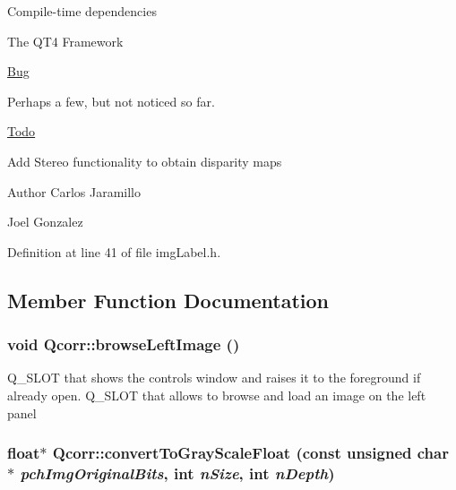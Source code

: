 \begin{DoxyParagraph}{Compile-\/time dependencies}

\end{DoxyParagraph}

\begin{DoxyItemize}
\item The QT4 Framework
\end{DoxyItemize}

\begin{Desc}
\item[\hyperlink{bug__bug000001}{Bug}]
\begin{DoxyItemize}
\item Perhaps a few, but not noticed so far.
\end{DoxyItemize}\end{Desc}
\begin{Desc}
\item[\hyperlink{todo__todo000001}{Todo}]
\begin{DoxyItemize}
\item Add Stereo functionality to obtain disparity maps
\end{DoxyItemize}\end{Desc}
\begin{DoxyAuthor}{Author}
Carlos Jaramillo 

Joel Gonzalez 
\end{DoxyAuthor}


Definition at line 41 of file imgLabel.h.

\subsection{Member Function Documentation}
\hypertarget{classQcorr_adb32e7bfe6afb84f306a9eb5bcd9b322}{
\subsubsection[{browseLeftImage}]{\setlength{\rightskip}{0pt plus 5cm}void Qcorr::browseLeftImage ()}}
\label{classQcorr_adb32e7bfe6afb84f306a9eb5bcd9b322}


Q\_\-SLOT that shows the controls window and raises it to the foreground if already open. Q\_\-SLOT that allows to browse and load an image on the left panel \hypertarget{classQcorr_a0f203c8a83cd1e6b503aee0a4c873402}{
\subsubsection[{convertToGrayScaleFloat}]{\setlength{\rightskip}{0pt plus 5cm}float$\ast$ Qcorr::convertToGrayScaleFloat (const unsigned char $\ast$ {\em pchImgOriginalBits}, \/  int {\em nSize}, \/  int {\em nDepth})}}
\label{classQcorr_a0f203c8a83cd1e6b503aee0a4c873402}


